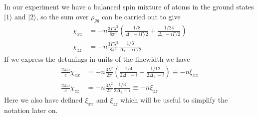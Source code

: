 In our experiment we have a balanced spin mixture of atoms in the ground states
$|1\rangle$ and $|2\rangle$,  so the sum over $\rho_{gg}$ can be carried out to
give 
\begin{equation}
\begin{split}
   \chi_{xx} & = - n  
    \frac{ 3 \Gamma \lambda^{3}}{ 8 \pi^{3}}
       \left( \frac{1/8}{\Delta_{-} - i \Gamma/2 } 
       +  
              \frac{1/24}{\Delta_{+} - i \Gamma/2 }  
       \right)  \\
   \chi_{zz} & = - n
    \frac{ 3 \Gamma \lambda^{3}}{ 8 \pi^{3}}
              \frac{1/6}{\Delta_{\pi} - i \Gamma/2 } 
\end{split}
\end{equation}
If we express the detunings in units of the linewidth we have 
\begin{equation}
\begin{split}
   \frac{2\pi\omega}{c} \chi_{xx} & = - n  
    \frac{ 3  \lambda^{2}}{ 2 \pi}
       \left( \frac{1/4}{2\Delta_{-} - i  } 
            + \frac{1/12}{2\Delta_{+} - i  }  
       \right) 
    \equiv - n \xi_{xx}
 \\
   \frac{2\pi\omega}{c} \chi_{zz} & = - n
    \frac{ 3  \lambda^{2}}{ 2 \pi}
              \frac{1/3}{2\Delta_{\pi} - i  } 
    \equiv - n \xi_{zz}
\label{eq:def-xis}
\end{split}
\end{equation}
Here we also have defined $\xi_{xx}$ and $\xi_{zz}$ which will be useful to 
simplify the notation later on.
 

